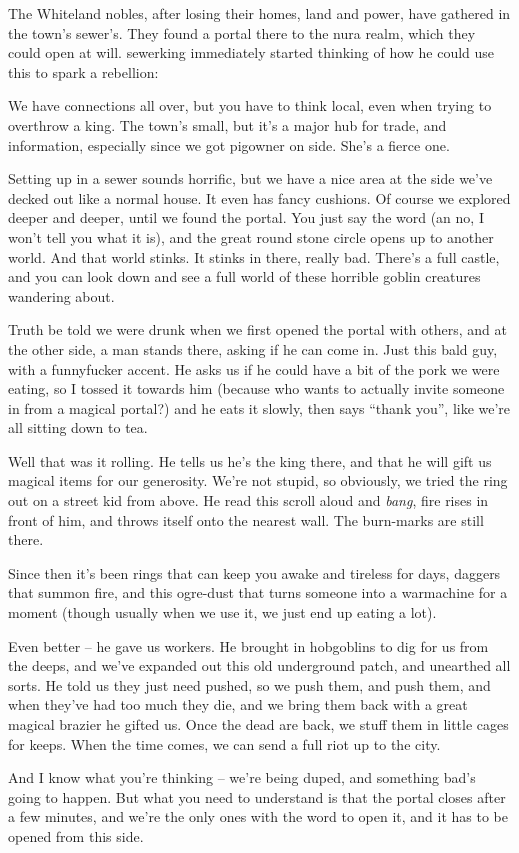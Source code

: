 The Whiteland nobles, after losing their homes, land and power, have gathered in the town's sewer's.  They found a portal there to the nura realm, which they could open at will.  \gls{sewerking} immediately started thinking of how he could use this to spark a rebellion:

\begin{speechtext}

	We have connections all over, but you have to think local, even when trying to overthrow a king.  The town's small, but it's a major hub for trade, and information, especially since we got \gls{pigowner} on side.  She's a fierce one.

	Setting up in a sewer sounds horrific, but we have a nice area at the side we've decked out like a normal house.  It even has fancy cushions.  Of course we explored deeper and deeper, until we found the portal.  You just say the word (an no, I won't tell you what it is), and the great round stone circle opens up to another world.  And that world stinks.  It stinks in there, really bad.  There's a full castle, and you can look down and see a full world of these horrible goblin creatures wandering about.

	Truth be told we were drunk when we first opened the portal with others, and at the other side, a man stands there, asking if he can come in.  Just this bald guy, with a funnyfucker accent.  He asks us if he could have a bit of the pork we were eating, so I tossed it towards him (because who wants to actually invite someone in from a magical portal?) and he eats it slowly, then says ``thank you'', like we're all sitting down to tea.

	Well that was it rolling.  He tells us he's the king there, and that he will gift us magical items for our generosity.  We're not stupid, so obviously, we tried the ring out on a street kid from above.  He read this scroll aloud and \emph{bang}, fire rises in front of him, and throws itself onto the nearest wall.  The burn-marks are still there.

	Since then it's been rings that can keep you awake and tireless for days, daggers that summon fire, and this ogre-dust that turns someone into a warmachine for a moment (though usually when we use it, we just end up eating a lot).

	Even better -- he gave us workers.  He brought in hobgoblins to dig for us from the deeps, and we've expanded out this old underground patch, and unearthed all sorts.  He told us they just need pushed, so we push them, and push them, and when they've had too much they die, and we bring them back with a great magical brazier he gifted us.  Once the dead are back, we stuff them in little cages for keeps.  When the time comes, we can send a full riot up to the city.

	And I know what you're thinking -- we're being duped, and something bad's going to happen.  But what you need to understand is that the portal closes after a few minutes, and we're the only ones with the word to open it, and it has to be opened from this side.

\end{speechtext}

